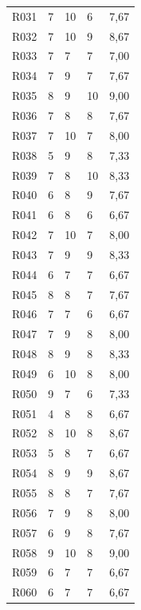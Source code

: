 {\begin{longtable}{L{1.05cm}R{2.1cm}R{2.1cm}R{2.1cm}R{3.0cm}}
R031 & 7 & 10 & 6 & 7,67 \\
R032 & 7 & 10 & 9 & 8,67 \\
R033 & 7 & 7 & 7 & 7,00 \\
R034 & 7 & 9 & 7 & 7,67 \\
R035 & 8 & 9 & 10 & 9,00 \\
R036 & 7 & 8 & 8 & 7,67 \\
R037 & 7 & 10 & 7 & 8,00 \\
R038 & 5 & 9 & 8 & 7,33 \\
R039 & 7 & 8 & 10 & 8,33 \\
R040 & 6 & 8 & 9 & 7,67 \\
R041 & 6 & 8 & 6 & 6,67 \\
R042 & 7 & 10 & 7 & 8,00 \\
R043 & 7 & 9 & 9 & 8,33 \\
R044 & 6 & 7 & 7 & 6,67 \\
R045 & 8 & 8 & 7 & 7,67 \\
R046 & 7 & 7 & 6 & 6,67 \\
R047 & 7 & 9 & 8 & 8,00 \\
R048 & 8 & 9 & 8 & 8,33 \\
R049 & 6 & 10 & 8 & 8,00 \\
R050 & 9 & 7 & 6 & 7,33 \\
R051 & 4 & 8 & 8 & 6,67 \\
R052 & 8 & 10 & 8 & 8,67 \\
R053 & 5 & 8 & 7 & 6,67 \\
R054 & 8 & 9 & 9 & 8,67 \\
R055 & 8 & 8 & 7 & 7,67 \\
R056 & 7 & 9 & 8 & 8,00 \\
R057 & 6 & 9 & 8 & 7,67 \\
R058 & 9 & 10 & 8 & 9,00 \\
R059 & 6 & 7 & 7 & 6,67 \\
R060 & 6 & 7 & 7 & 6,67 \\
\end{longtable}
}

